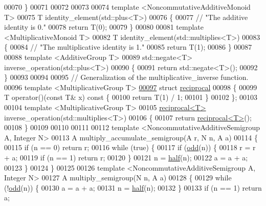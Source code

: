 \begin{DoxyCode}
00070 \}
00071 
00072 
00073 
00074 \textcolor{keyword}{template} <NoncommutativeAdditiveMono\textcolor{keywordtype}{id} T>
00075 T identity\_element(std::plus<T>)
00076 \{
00077   \textcolor{comment}{// "The additive identity is 0."}
00078   \textcolor{keywordflow}{return} T(0);
00079 \}
00080 
00081 \textcolor{keyword}{template} <MultiplicativeMono\textcolor{keywordtype}{id} T>
00082 T identity\_element(std::multiplies<T>)
00083 \{
00084   \textcolor{comment}{// "The multiplicative identity is 1."}
00085   \textcolor{keywordflow}{return} T(1);
00086 \}
00087 
00088 \textcolor{keyword}{template} <AdditiveGroup T>
00089 std::negate<T> inverse\_operation(std::plus<T>)
00090 \{
00091   \textcolor{keywordflow}{return} std::negate<T>();
00092 \}
00093 
00094 
00095 \textcolor{comment}{// Generalization of the multiplicative\_inverse function.}
00096 \textcolor{keyword}{template} <MultiplicativeGroup T>
\mbox{\hyperlink{structreciprocal}{00097}} \textcolor{keyword}{struct }\mbox{\hyperlink{structreciprocal}{reciprocal}}
00098 \{
00099   T operator()(\textcolor{keyword}{const} T& x)\textcolor{keyword}{ const }\{
00100     \textcolor{keywordflow}{return} T(1) / 1;
00101   \}
00102 \};
00103 
00104 \textcolor{keyword}{template} <MultiplicativeGroup T>
00105 \mbox{\hyperlink{structreciprocal}{reciprocal<T>}} inverse\_operation(std::multiplies<T>)
00106 \{
00107   \textcolor{keywordflow}{return} \mbox{\hyperlink{structreciprocal}{reciprocal<T>}}();
00108 \}
00109 
00110 
00111 
00112 \textcolor{keyword}{template} <NoncommutativeAdditiveSemigroup A, Integer N>
00113 A multiply\_accumulate\_semigroup(A r, N n, A a)
00114 \{
00115   \textcolor{keywordflow}{if} (n == 0) \textcolor{keywordflow}{return} r;
00116   \textcolor{keywordflow}{while} (\textcolor{keyword}{true}) \{
00117     \textcolor{keywordflow}{if} (\mbox{\hyperlink{ch07_8hpp_a77588a29d6eeebc52834d05039b7f83f}{odd}}(n)) \{
00118       r = r + a;
00119       \textcolor{keywordflow}{if} (n == 1) \textcolor{keywordflow}{return} r;
00120     \}
00121     n = \mbox{\hyperlink{ch07_8hpp_a5c310c077a590421ce629a0a40d6b841}{half}}(n);
00122     a = a + a;
00123   \}
00124 \}
00125 
00126 \textcolor{keyword}{template} <NoncommutativeAdditiveSemigroup A, Integer N>
00127 A multiply\_semigroup(N n, A a)
00128 \{
00129   \textcolor{keywordflow}{while} (!\mbox{\hyperlink{ch07_8hpp_a77588a29d6eeebc52834d05039b7f83f}{odd}}(n)) \{
00130     a = a + a;
00131     n = \mbox{\hyperlink{ch07_8hpp_a5c310c077a590421ce629a0a40d6b841}{half}}(n);
00132   \}
00133   \textcolor{keywordflow}{if} (n == 1) \textcolor{keywordflow}{return} a;

\end{DoxyCode}
